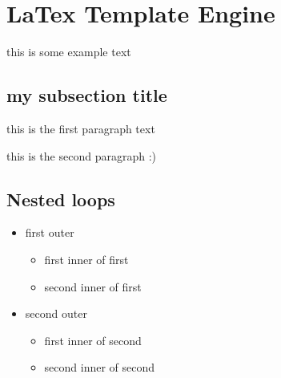 \documentclass[12pt]{article}
\begin{document}
\section{LaTex Template \latex Engine}

this is some example text

\subsection{my subsection title}
this is the first paragraph text

this is the second paragraph :)


\subsection{Nested loops}

\begin{itemize}
	\item first outer
	      \begin{itemize}
		      \item first inner of first
		      \item second inner of first
	      \end{itemize}
	\item second outer
	      \begin{itemize}
		      \item first inner of second
		      \item second inner of second
	      \end{itemize}
\end{itemize}
\end{document}

